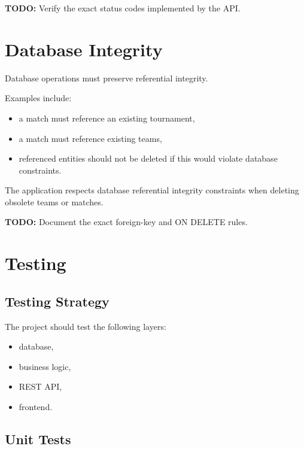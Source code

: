 \documentclass[12pt,a4paper]{article}
\begin{document}
\textbf{TODO:} Verify the exact status codes implemented by the API.


\section{Database Integrity}

Database operations must preserve referential integrity.

Examples include:

\begin{itemize}
    \item a match must reference an existing tournament,
    \item a match must reference existing teams,
    \item referenced entities should not be deleted if this would
    violate database constraints.
\end{itemize}

The application respects database referential integrity constraints
when deleting obsolete teams or matches.

\textbf{TODO:} Document the exact foreign-key and ON DELETE rules.


\section{Testing}

\subsection{Testing Strategy}

The project should test the following layers:

\begin{itemize}
    \item database,
    \item business logic,
    \item REST API,
    \item frontend.
\end{itemize}

\subsection{Unit Tests}
\end{document}

